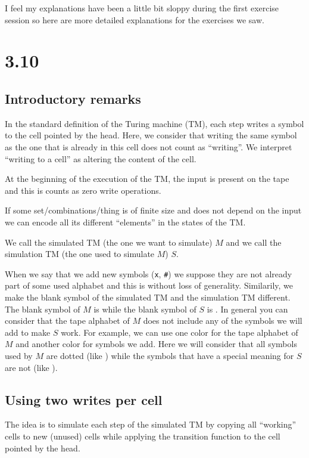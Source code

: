 \documentclass{article}
\newcommand\obullet[1]{\ThisStyle{\ensurestackMath{%
  \stackon[1pt]{\SavedStyle#1}{\SavedStyle\kern.6\LMpt\bullet}}}}
\newcommand{\blank}{\texttt{\textvisiblespace}}
\newcommand{\oblank}{\obullet{\blank}}
\newcommand{\x}{\texttt{x}}
\newcommand{\e}{\texttt{\#}}
\newcommand{\TM}{TM}
\begin{document}
I feel my explanations have been a little bit sloppy during the first exercise
session so here are more detailed explanations for the exercises we saw.

\section*{3.10}

\subsection*{Introductory remarks}
In the standard definition of the Turing machine (\TM{}), each step writes a symbol to
the cell pointed by the head. Here, we consider that writing the same symbol as
the one that is already in this cell does not count as ``writing''. We
interpret ``writing to a cell'' as altering the content of the cell.

At the beginning of the execution of the \TM{}, the input is
present on the tape and this is counts as zero write operations.

If some set/combinations/thing is of finite size and does not depend on the input
we can encode all its different ``elements'' in the states of the \TM{}.

We call the simulated \TM{} (the one we want to simulate) \(M\) and we
call the simulation \TM{} (the one used to simulate \(M\)) \(S\).

When we say that we add new symbols (\x, \e) we suppose they
are not already part of some used alphabet and this is without loss of
generality.
Similarily, we make the blank symbol of the simulated \TM{} and the
simulation \TM{} different. The blank symbol of \(M\)
is \oblank{} while the blank symbol of \(S\)
is \blank{}. In general you can consider that the tape alphabet of \(M\)
does not include any of the symbols we will add to make \(S\) work.
For example, we can use one color for the tape alphabet of \(M\) and
another color for symbols we add. Here we will consider that all symbols used
by \(M\) are dotted (like \oblank{}) while the symbols that
have a special meaning for \(S\) are not (like \blank{}).

\subsection*{Using two writes per cell}
The idea is to simulate each step of the simulated
\TM{} by copying all ``working'' cells to new (unused) cells
while applying the transition function to the cell pointed by the head.
\end{document}
